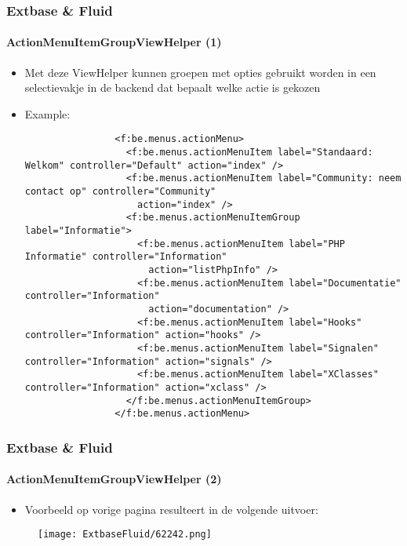 \begin{frame}[fragile]
	\frametitle{Extbase \& Fluid}
	\framesubtitle{ActionMenuItemGroupViewHelper (1)}

	\lstset{basicstyle=\tiny\ttfamily}

	\begin{itemize}

		\item Met deze ViewHelper kunnen groepen met opties gebruikt worden in een selectievakje in de backend
			dat bepaalt welke actie is gekozen

		\item Example:
			\begin{lstlisting}
				<f:be.menus.actionMenu>
				  <f:be.menus.actionMenuItem label="Standaard: Welkom" controller="Default" action="index" />
				  <f:be.menus.actionMenuItem label="Community: neem contact op" controller="Community"
				    action="index" />
				  <f:be.menus.actionMenuItemGroup label="Informatie">
				    <f:be.menus.actionMenuItem label="PHP Informatie" controller="Information"
				      action="listPhpInfo" />
				    <f:be.menus.actionMenuItem label="Documentatie" controller="Information"
				      action="documentation" />
				    <f:be.menus.actionMenuItem label="Hooks" controller="Information" action="hooks" />
				    <f:be.menus.actionMenuItem label="Signalen" controller="Information" action="signals" />
				    <f:be.menus.actionMenuItem label="XClasses" controller="Information" action="xclass" />
				  </f:be.menus.actionMenuItemGroup>
				</f:be.menus.actionMenu>
			\end{lstlisting}

	\end{itemize}

\end{frame}


\begin{frame}[fragile]
	\frametitle{Extbase \& Fluid}
	\framesubtitle{ActionMenuItemGroupViewHelper (2)}

	\begin{itemize}
		\item Voorbeeld op vorige pagina resulteert in de volgende uitvoer:
	\end{itemize}

	\begin{figure}
		\texttt{[image: ExtbaseFluid/62242.png]}
	\end{figure}

\end{frame}

